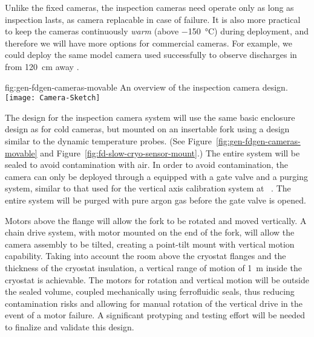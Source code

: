 Unlike the fixed cameras, the inspection cameras need operate only as
long as inspection lasts, as camera replacable in case of failure.  It
is also more practical to keep the cameras continuously \textit{warm}
(above \SI{-150}{\celsius}) during deployment, and therefore we will
have more options for commercial cameras.  For example, we could
deploy the same model camera used successfully to observe discharges
in \lar from \SI{120}{cm} away \cite{Auger:2015xlo}.

\begin{dunefigure}{fig:gen-fdgen-cameras-movable}
  {An overview of the inspection camera design.}
  \texttt{[image: Camera-Sketch]}%
\end{dunefigure}

The design for the inspection camera system will use the same basic
enclosure design as for cold cameras, but mounted on an insertable
fork using a design similar to the dynamic temperature probes. (See
Figure~\ref{fig:gen-fdgen-cameras-movable} and
Figure~\ref{fig:fd-slow-cryo-sensor-mount}.)  The entire system will be sealed to
avoid contamination with air. In order to avoid contamination, the
camera can only be deployed through a \fdth equipped with a gate
valve and a purging system, similar to that used for the vertical axis
calibration system at \kamland~\cite{Banks:2014hra}. The entire system
will be purged with pure argon gas before the gate valve is opened.

Motors above the flange will allow the fork to be
rotated and moved vertically.  A chain drive system, with motor
mounted on the end of the fork, will allow the camera assembly to be
tilted, creating a point-tilt mount with vertical motion capability.
Taking into account the room above the cryostat flanges and the
thickness of the cryostat insulation, a vertical range of motion of
\SI{1}{m} inside the cryostat is achievable.
The motors for rotation and vertical motion will be outside the sealed
volume, coupled mechanically using ferrofluidic seals, thus reducing
contamination risks and allowing for manual rotation of the vertical
drive in the event of a motor failure.  A significant protyping and
testing effort will be needed to finalize and validate this design.


